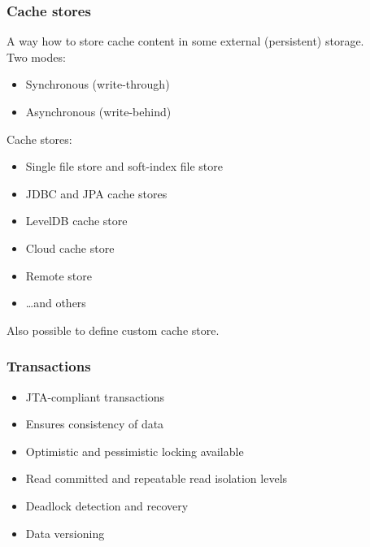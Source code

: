 \documentclass[10pt,utf8]{beamer}
\begin{document}
\begin{frame}
	\frametitle{Cache stores}
	A way how to store cache content in some external (persistent) storage.\\
	Two modes:
	\begin{itemize}
	 \item Synchronous (write-through)
	 \item Asynchronous (write-behind)
	\end{itemize}
	Cache stores:
	\begin{itemize}
		\item Single file store and soft-index file store
		\item JDBC and JPA cache stores
		\item LevelDB cache store
		\item Cloud cache store
		\item Remote store
		\item \dots and others
  \end{itemize}
	Also possible to define custom cache store.
\end{frame}

\begin{frame}
	\frametitle{Transactions}
	\begin{itemize}
	 \item JTA-compliant transactions
	 \item Ensures consistency of data
	 \item Optimistic and pessimistic locking available
	 \item Read committed and repeatable read isolation levels
	 \item Deadlock detection and recovery
	 \item Data versioning
	\end{itemize}
\end{frame}
\end{document}
